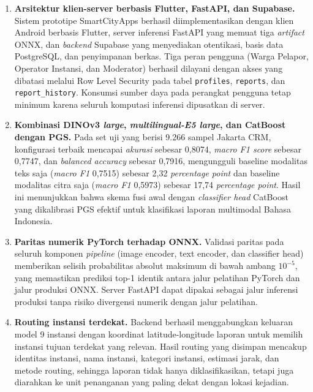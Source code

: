 \begin{enumerate}
    \item \textbf{Arsitektur klien-server berbasis Flutter, FastAPI, dan Supabase.} Sistem prototipe SmartCityApps berhasil diimplementasikan dengan klien Android berbasis Flutter, server inferensi FastAPI yang memuat tiga \textit{artifact} ONNX, dan \textit{backend} Supabase yang menyediakan otentikasi, basis data PostgreSQL, dan penyimpanan berkas. Tiga peran pengguna (Warga Pelapor, Operator Instansi, dan Moderator) berhasil dilayani dengan akses yang dibatasi melalui Row Level Security pada tabel \texttt{profiles}, \texttt{reports}, dan \texttt{report\_history}. Konsumsi sumber daya pada perangkat pengguna tetap minimum karena seluruh komputasi inferensi dipusatkan di server.

    \item \textbf{Kombinasi DINOv3 \textit{large}, \textit{multilingual-E5 large}, dan CatBoost dengan PGS.} Pada set uji yang berisi 9.266 sampel Jakarta CRM, konfigurasi terbaik mencapai \textit{akurasi} sebesar 0,8074, \textit{macro F1 score} sebesar 0,7747, dan \textit{balanced accuracy} sebesar 0,7916, mengungguli baseline modalitas teks saja (\textit{macro F1} 0,7515) sebesar 2,32 \textit{percentage point} dan baseline modalitas citra saja (\textit{macro F1} 0,5973) sebesar 17,74 \textit{percentage point}. Hasil ini menunjukkan bahwa skema fusi awal dengan \textit{classifier head} CatBoost yang dikalibrasi PGS efektif untuk klasifikasi laporan multimodal Bahasa Indonesia.

    \item \textbf{Paritas numerik PyTorch terhadap ONNX.} Validasi paritas pada seluruh komponen \textit{pipeline} (image encoder, text encoder, dan classifier head) memberikan selisih probabilitas absolut maksimum di bawah ambang $10^{-5}$, yang memastikan prediksi top-1 identik antara jalur pelatihan PyTorch dan jalur produksi ONNX. Server FastAPI dapat dipakai sebagai jalur inferensi produksi tanpa risiko divergensi numerik dengan jalur pelatihan.

    \item \textbf{Routing instansi terdekat.} Backend berhasil menggabungkan keluaran model 9 instansi dengan koordinat latitude-longitude laporan untuk memilih instansi tujuan terdekat yang relevan. Hasil routing yang disimpan mencakup identitas instansi, nama instansi, kategori instansi, estimasi jarak, dan metode routing, sehingga laporan tidak hanya diklasifikasikan, tetapi juga diarahkan ke unit penanganan yang paling dekat dengan lokasi kejadian.


\end{enumerate}

